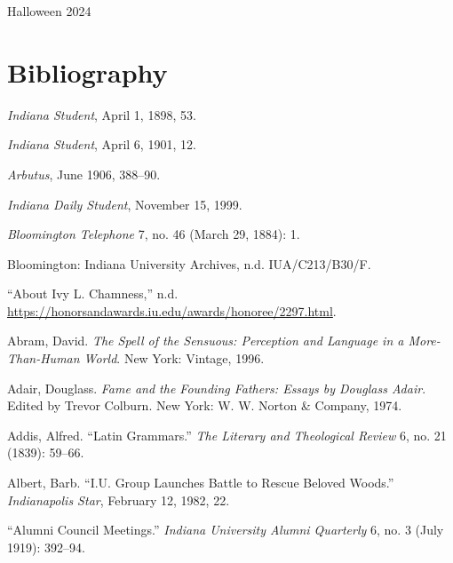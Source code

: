 \documentclass[
  american,
  letterpaper,
]{scrreprt}
\newlength{\cslhangindent}
\newenvironment{CSLReferences}[2] %
 {\begin{list}{}{%
  \setlength{\itemindent}{0pt}
  \setlength{\leftmargin}{0pt}
  \setlength{\parsep}{0pt}
  \ifodd #1
   \setlength{\leftmargin}{\cslhangindent}
   \setlength{\itemindent}{-1\cslhangindent}
  \fi
  \setlength{\itemsep}{#2\baselineskip}}}
 {\end{list}}
\begin{document}
\begin{flushright}
Halloween 2024
\end{flushright}


\chapter*{Bibliography}\label{bibliography}


\label{refs}
\begin{CSLReferences}{1}{0}
\emph{Indiana Student}, April 1, 1898, 53.

\emph{Indiana Student}, April 6, 1901, 12.

\emph{Arbutus}, June 1906, 388--90.

\emph{Indiana Daily Student}, November 15, 1999.

\emph{Bloomington Telephone} 7, no. 46 (March 29, 1884): 1.

Bloomington: Indiana University Archives, n.d. IUA/C213/B30/F.

{``{About Ivy L. Chamness},''} n.d.
\url{https://honorsandawards.iu.edu/awards/honoree/2297.html}.

Abram, David. \emph{The Spell of the Sensuous: Perception and Language
in a More-Than-Human World}. New York: Vintage, 1996.

Adair, Douglass. \emph{Fame and the Founding Fathers: Essays by Douglass
Adair}. Edited by Trevor Colburn. New York: W. W. Norton \& Company,
1974.

Addis, Alfred. {``Latin Grammars.''} \emph{The Literary and Theological
Review} 6, no. 21 (1839): 59--66.

Albert, Barb. {``{I.U.} Group Launches Battle to Rescue Beloved
Woods.''} \emph{Indianapolis Star}, February 12, 1982, 22.

{``Alumni Council Meetings.''} \emph{Indiana University Alumni
Quarterly} 6, no. 3 (July 1919): 392--94.


\end{CSLReferences}
\end{document}
